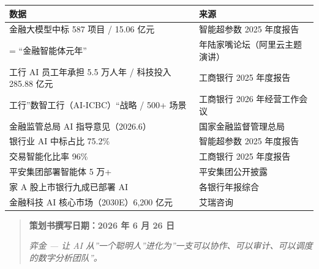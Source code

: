 \documentclass[
]{ctexart}
\begin{document}
\begin{longtable}[]{@{}
  >{\raggedright\arraybackslash}p{}
  >{\raggedright\arraybackslash}p{}@{}}
\toprule\noalign{}
\begin{minipage}[b]{\linewidth}\raggedright
数据
\end{minipage} & \begin{minipage}[b]{\linewidth}\raggedright
来源
\end{minipage} \\
\midrule\noalign{}
\endhead
\bottomrule\noalign{}
\endlastfoot
金融大模型中标 587 项目 / 15.06 亿元 & 智能超参数 2025 年度报告 \\
2026 = ``金融智能体元年'' & 2026 年陆家嘴论坛（阿里云主题演讲） \\
工行 AI 员工年承担 5.5 万人年 / 科技投入 285.88 亿元 & 工商银行 2025
年度报告 \\
工行''数智工行（AI-ICBC）``战略 / 500+ 场景 & 工商银行 2026
年经营工作会议 \\
金融监管总局 AI 指导意见（2026.6） & 国家金融监督管理总局 \\
银行业 AI 中标占比 75.2\% & 智能超参数 2025 年度报告 \\
交易智能化比率 96\% & 工商银行 2025 年度报告 \\
平安集团部署智能体 5 万+ & 平安集团公开披露 \\
42 家 A 股上市银行九成已部署 AI & 各银行年报综合 \\
金融科技 AI 核心市场（2030E）6,200 亿元 & 艾瑞咨询 \\
\end{longtable}


\begin{quote}
\textbf{策划书撰写日期：2026 年 6 月 26 日}

\emph{弈金 --- 让 AI
从''一个聪明人''进化为''一支可以协作、可以审计、可以调度的数字分析团队''。}
\end{quote}
\end{document}
